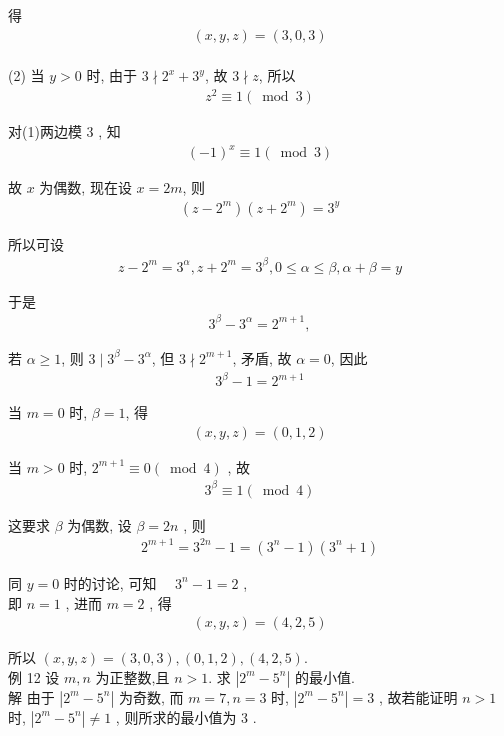 得
\begin{align*}
	(x, y, z)=(3,0,3)
\end{align*}\\
(2) 当 $y>0$ 时, 由于 $3 \nmid 2^{x}+3^{y}$, 故 $3 \nmid z$, 所以
\begin{align*}
	z^{2} \equiv 1(\bmod 3)
\end{align*}

对(1)两边模 3 , 知
\begin{align*}
	(-1)^{x} \equiv 1(\bmod 3)
\end{align*}

故 $x$ 为偶数, 现在设 $x=2 m$, 则
\begin{align*}
	\left(z-2^{m}\right)\left(z+2^{m}\right)=3^{y}
\end{align*}

所以可设
\begin{align*}
	z-2^{m}=3^{\alpha}, z+2^{m}=3^{\beta}, 0 \leqslant \alpha \leqslant \beta, \alpha+\beta=y
\end{align*}

于是
\begin{align*}
	3^{\beta}-3^{\alpha}=2^{m+1},
\end{align*}

若 $\alpha \geqslant 1$, 则 $3 \mid 3^{\beta}-3^{\alpha}$, 但 $3 \nmid 2^{m+1}$, 矛盾, 故 $\alpha=0$, 因此
\begin{align*}
	3^{\beta}-1=2^{m+1}
\end{align*}

当 $m=0$ 时, $\beta=1$, 得
\begin{align*}
	(x, y, z)=(0,1,2)
\end{align*}

当 $m>0$ 时, $2^{m+1} \equiv 0(\bmod 4)$ , 故
\begin{align*}
	3^{\beta} \equiv 1(\bmod 4)
\end{align*}

这要求 $\beta$ 为偶数, 设 $\beta=2 n$ , 则
\begin{align*}
	2^{m+1}=3^{2 n}-1=\left(3^{n}-1\right)\left(3^{n}+1\right)
\end{align*}

同 $y=0$ 时的讨论, 可知 $\quad 3^{n}-1=2$ , \\
即 $n=1$ , 进而 $m=2$ , 得
\begin{align*}
	(x, y, z)=(4,2,5)
\end{align*}

所以 $(x, y, z)=(3,0,3),(0,1,2),(4,2,5)$.\\
例 12 设 $m ,  n$ 为正整数,且 $n>1$. 求 $\left|2^{m}-5^{n}\right|$ 的最小值.\\
解 由于 $\left|2^{m}-5^{n}\right|$ 为奇数, 而 $m=7, n=3$ 时,  $\left|2^{m}-5^{n}\right|=3$ , 故若能证明 $n>1$ 时,  $\left|2^{m}-5^{n}\right| \neq 1$ , 则所求的最小值为 3 .

